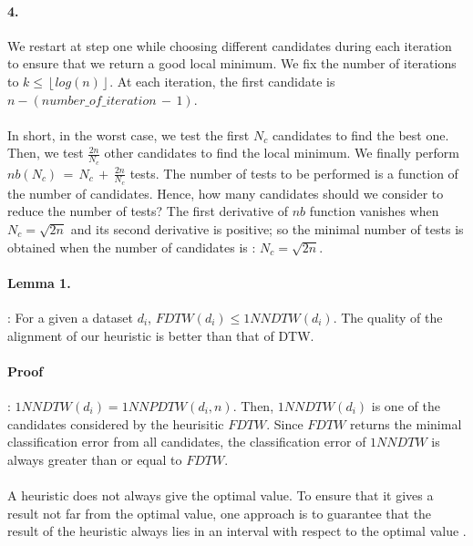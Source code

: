 \paragraph{4.} We restart at step one while choosing
different candidates during each iteration to ensure that we return a good
local minimum. We fix the number of iterations to $k \leq \left\lfloor log(n)\right\rfloor $. At each iteration, the first candidate is $n-(number \_ of \_ iteration \,-\, 1)$.

\paragraph{}In short, in the worst case, we test the first $N_{c}$ candidates to find the best one.
Then, we test $\frac{2n}{N_{c}}$ other candidates to find the local minimum.
We finally perform $nb(N_{c})\, =\, N_{c}\, +\, \frac{2n}{N_{c}}$ tests. The number of tests
 to be performed is a function of the number of candidates. Hence, how many
candidates should we consider to reduce the number of tests? The first
derivative of $nb$ function  vanishes when $N_{c}=\sqrt{2n}$ and its second derivative is
positive; so the minimal number of tests is obtained when the number of candidates is : 
$N_{c}=\sqrt{2n}$.

\paragraph{Lemma 1.}:
For a given a dataset $d_i$,
$ FDTW(d_{i}) \leq 1NNDTW(d_{i}) $. The quality of the alignment of our heuristic
is better than that of DTW.


\paragraph{Proof}:
 $1NNDTW(d_i) = 1NNPDTW(d_i,n)$. Then, $1NNDTW(d_i)$ is one of the
candidates considered by the heurisitic $FDTW$. Since $FDTW$ returns the
minimal classification error from all candidates, the classification error of
$1NNDTW$ is always greater than or equal to $FDTW$.

\paragraph{} A heuristic does not always give the optimal value. To ensure that
it gives a result not far from the optimal value, one approach is to
 guarantee that the result of the heuristic always lies in an interval with respect to the optimal
value \cite{ibarra1975fast}.

